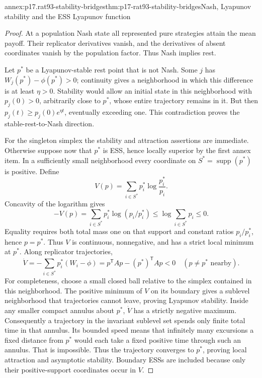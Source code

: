 \begin{annexitem}{annex:p17.rat93-stability-bridges}{thm:p17-rat93-stability-bridges}{Nash, Lyapunov stability and the ESS Lyapunov function}
\begin{proof}
At a population Nash state all represented pure strategies attain the
mean payoff. Their replicator derivatives vanish, and the derivatives
of absent coordinates vanish by the population factor. Thus Nash
implies rest.

Let \(p^*\) be a Lyapunov-stable rest point that is not Nash.
Some \(j\) has \(W_j(p^*)-\phi(p^*)>0\); continuity gives
a neighborhood in which this difference is at least \(\eta>0\).
Stability would allow an initial state in this neighborhood with
\(p_j(0)>0\), arbitrarily close to \(p^*\), whose entire trajectory
remains in it. But then \(p_j(t)\geq p_j(0)e^{\eta t}\), eventually
exceeding one. This contradiction proves the stable-rest-to-Nash direction.

For the singleton simplex the stability and attraction assertions are
immediate. Otherwise suppose now that \(p^*\) is ESS, hence locally
superior by the first annex item. In a sufficiently small neighborhood every coordinate
on \(S^*=\operatorname{supp}(p^*)\) is positive. Define
\[
 V(p)=\sum_{i\in S^*}p_i^*\log\frac{p_i^*}{p_i}.
\]
Concavity of the logarithm gives
\[
 -V(p)=\sum_{i\in S^*}p_i^*\log(p_i/p_i^*)
       \leq\log\sum_{i\in S^*}p_i\leq0.
\]
Equality requires both total mass one on that support and constant
ratios \(p_i/p_i^*\), hence \(p=p^*\). Thus \(V\) is continuous,
nonnegative, and has a strict local minimum at \(p^*\).
Along replicator trajectories,
\[
 \dot V=-\sum_{i\in S^*}p_i^*(W_i-\phi)
         =p^{\mathsf T}Ap-(p^*)^{\mathsf T}Ap<0
                       \quad(p\ne p^*\text{ nearby}).
\]
For completeness, choose a small closed ball relative to the simplex
contained in this neighborhood. The positive minimum of \(V\) on
its boundary gives a sublevel neighborhood that trajectories cannot
leave, proving Lyapunov stability. Inside any smaller compact annulus
about \(p^*\), \(\dot V\) has a strictly negative maximum.
Consequently a trajectory in the invariant sublevel set spends only
finite total time in that annulus. Its bounded speed means that
infinitely many excursions a fixed distance from \(p^*\) would each
take a fixed positive time through such an annulus. That is impossible.
Thus the trajectory converges to \(p^*\), proving local attraction
and asymptotic stability. Boundary ESSs are included because only
their positive-support coordinates occur in \(V\).
\end{proof}
\end{annexitem}

